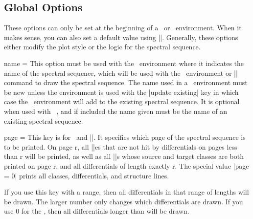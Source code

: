 \begin{sseqdata}[name = basic, cohomological Serre grading]
\section{Global Options}
These options can only be set at the beginning of a \sseqdataenv\  or \sseqpageenv\  environment. When it makes sense, you can also set a default value using |\sseqset|. Generally, these options either modify the plot style or the logic for the spectral sequence.
\begin{key}{name = }
This option must be used with the \sseqdataenv\  environment where it indicates the name of the spectral sequence, which will be used with the \sseqpageenv\  environment or |\printpage| command to draw the spectral sequence. The name used in a \sseqdataenv\  environment must be new unless the environment is used with the |update existing| key in which case the \sseqdataenv\  environment will add to the existing spectral sequence. It is optional when used with \sseqpageenv\ , and if included the name given must be the name of an existing spectral sequence.
\end{key}

\begin{key}{page = }
This key is for \sseqpageenv\  and |\printpage|. It specifies which page of the spectral sequence is to be printed. On page r, all |\class|es that are not hit by differentials on pages less than r will be printed, as well as all |\structline|s whose source and target classes are both printed on page r, and all differentials of length exactly r. The special value |page = 0| prints all classes, differentials, and structure lines.

If you use this key with a range, then all differentials in that range of lengths will be drawn. The larger number only changes which differentials are drawn. If you use 0 for the , then all differentials longer than  will be drawn.
\end{key}

\end{sseqdata}
